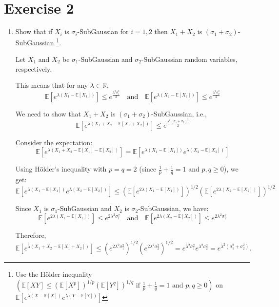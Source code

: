 \documentclass[a4 paper]{article}
\numberwithin{equation}{section}
\theoremstyle{boldStyle}
\theoremstyle{boldBlueStyle}
\theoremstyle{boldPurpleStyle}
\theoremstyle{boldRedStyle}
\begin{document}
\newpage
\section*{Exercise 2}
\begin{enumerate}
\item \textcolor{blueColor}{
  Show that if \(X_i\) is \(\sigma_i\)-SubGaussian for \(i = 1, 2\) then \(X_1 + X_2\) is \((\sigma_1 + \sigma_2)\)-SubGaussian
\footnote{Use the Hölder inequality \((\mathbb{E}[XY] \leq (\mathbb{E}[X^p])^{1/p} (\mathbb{E}[Y^q])^{1/q} \text{ if } \frac{1}{p} + \frac{1}{q} = 1 \text{ and } p, q \geq 0)\) 
on \(\mathbb{E}[e^{\lambda (X - \mathbb{E}[X])} e^{\lambda (Y - \mathbb{E}[Y])}]\)}.} 

Let \(X_1\) and \(X_2\) be \(\sigma_1\)-SubGaussian and \(\sigma_2\)-SubGaussian random variables, respectively. 

This means that for any \(\lambda \in \mathbb{R}\),
\[
\mathbb{E}\left[e^{\lambda (X_1 - \mathbb{E}[X_1])}\right] \leq e^{\frac{\lambda^2 \sigma_1^2}{2}} \quad \text{and} 
\quad \mathbb{E}\left[e^{\lambda (X_2 - \mathbb{E}[X_2])}\right] \leq e^{\frac{\lambda^2 \sigma_2^2}{2}}
\]

We need to show that \(X_1 + X_2\) is \((\sigma_1 + \sigma_2)\)-SubGaussian, i.e.,
\[
\mathbb{E}\left[e^{\lambda (X_1 + X_2 - \mathbb{E}[X_1 + X_2])}\right] \leq e^{\frac{\lambda^2 (\sigma_1 + \sigma_2)^2}{2}}
\]

Consider the expectation:
\[
\mathbb{E}\left[e^{\lambda (X_1 + X_2 - \mathbb{E}[X_1] - \mathbb{E}[X_2])}\right] = \mathbb{E}\left[e^{\lambda (X_1 - \mathbb{E}[X_1])} e^{\lambda (X_2 - \mathbb{E}[X_2])}\right]
\]

Using Hölder's inequality with \(p = q = 2\) (since \(\frac{1}{p} + \frac{1}{q} = 1\) and \(p, q \geq 0\)), we get:
\[
\mathbb{E}\left[e^{\lambda (X_1 - \mathbb{E}[X_1])} e^{\lambda (X_2 - \mathbb{E}[X_2])}\right] \leq 
\left(\mathbb{E}\left[e^{2\lambda (X_1 - \mathbb{E}[X_1])}\right]\right)^{1/2} \left(\mathbb{E}\left[e^{2\lambda (X_2 - \mathbb{E}[X_2])}\right]\right)^{1/2}
\]

Since \(X_1\) is \(\sigma_1\)-SubGaussian and \(X_2\) is \(\sigma_2\)-SubGaussian, we have:
\[
\mathbb{E}\left[e^{2\lambda (X_1 - \mathbb{E}[X_1])}\right] \leq e^{2\lambda^2 \sigma_1^2} \quad \text{and} 
\quad \mathbb{E}\left[e^{2\lambda (X_2 - \mathbb{E}[X_2])}\right] \leq e^{2\lambda^2 \sigma_2^2}
\]

Therefore,
\[
\mathbb{E}\left[e^{\lambda (X_1 + X_2 - \mathbb{E}[X_1 + X_2])}\right] \leq \left(e^{2\lambda^2 \sigma_1^2}\right)^{1/2} \left(e^{2\lambda^2 \sigma_2^2}\right)^{1/2} = e^{\lambda^2 \sigma_1^2} e^{\lambda^2 \sigma_2^2} = e^{\lambda^2 (\sigma_1^2 + \sigma_2^2)}.
\]


\end{enumerate}
\end{document}
